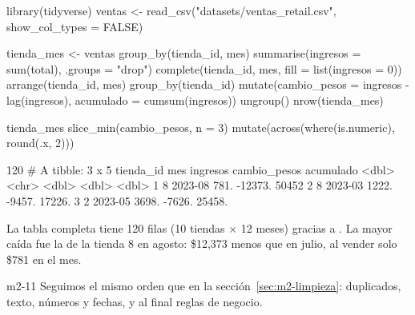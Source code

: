 \begin{rcode}
library(tidyverse)
ventas <- read_csv("datasets/ventas_retail.csv", show_col_types = FALSE)

tienda_mes <- ventas %
  group_by(tienda_id, mes) %
  summarise(ingresos = sum(total), .groups = "drop") %
  complete(tienda_id, mes, fill = list(ingresos = 0)) %
  arrange(tienda_id, mes) %
  group_by(tienda_id) %
  mutate(cambio_pesos = ingresos - lag(ingresos),
         acumulado    = cumsum(ingresos)) %
  ungroup()
nrow(tienda_mes)

tienda_mes %
  slice_min(cambio_pesos, n = 3) %
  mutate(across(where(is.numeric), ~ round(.x, 2)))
\end{rcode}
\begin{rsalida}
[1] 120
# A tibble: 3 x 5
  tienda_id mes     ingresos cambio_pesos acumulado
      <dbl> <chr>      <dbl>        <dbl>     <dbl>
1         8 2023-08     781.      -12373.    50452 
2         8 2023-03    1222.       -9457.    17226.
3         2 2023-05    3698.       -7626.    25458.
\end{rsalida}

La tabla completa tiene 120 filas (10 tiendas $\times$ 12 meses) gracias
a . La mayor caída fue la de la tienda 8 en agosto:
\$12,373 menos que en julio, al vender solo \$781 en el mes.


\begin{solucion}{m2-11}
Seguimos el mismo orden que en la sección~\ref{sec:m2-limpieza}:
duplicados, texto, números y fechas, y al final reglas de negocio.
\end{solucion}


